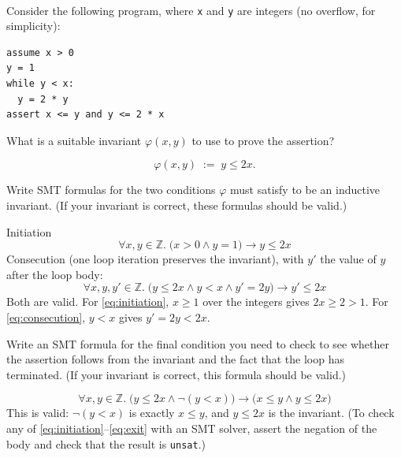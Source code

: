 \documentclass[11pt]{article}
\begin{document}
\begin{qunlist}
\begin{qparts}
\begin{answer}
    \end{answer}
  \end{qparts}

  \\
  Consider the following program, where \texttt{x} and \texttt{y} are integers (no overflow, for simplicity):
\begin{verbatim}
assume x > 0
y = 1
while y < x:
  y = 2 * y
assert x <= y and y <= 2 * x
\end{verbatim}

  \begin{qparts}
  \item
    What is a suitable invariant $\varphi(x,y)$ to use to prove the assertion?

    \begin{answer}
      \[
        \varphi(x,y) \;:=\; y \le 2x .
      \]
    \end{answer}

  \item
    Write SMT formulas for the two conditions $\varphi$ must satisfy to be an inductive invariant.
    (If your invariant is correct, these formulas should be valid.)

    \begin{answer}
      Initiation
      \begin{equation}\label{eq:initiation}
        \forall x, y \in \mathbb{Z}.\; \bigl(x > 0 \wedge y = 1\bigr) \rightarrow y \le 2x
      \end{equation}
      Consecution (one loop iteration preserves the invariant), with $y'$ the value of $y$ after the loop body:
      \begin{equation}\label{eq:consecution}
        \forall x, y, y' \in \mathbb{Z}.\; \bigl(y \le 2x \wedge y < x \wedge y' = 2y\bigr) \rightarrow y' \le 2x
      \end{equation}
      Both are valid. For \eqref{eq:initiation}, $x \ge 1$ over the integers gives $2x \ge 2 > 1$. For \eqref{eq:consecution}, $y < x$ gives $y' = 2y < 2x$.
    \end{answer}

  \item
    Write an SMT formula for the final condition you need to check to see whether the assertion follows from the invariant and the fact that the loop has terminated.
    (If your invariant is correct, this formula should be valid.)

    \begin{answer}
      \begin{equation}\label{eq:exit}
        \forall x, y \in \mathbb{Z}.\; \bigl(y \le 2x \wedge \neg (y < x)\bigr) \rightarrow \bigl(x \le y \wedge y \le 2x\bigr)
      \end{equation}
      This is valid: $\neg(y < x)$ is exactly $x \le y$, and $y \le 2x$ is the invariant.
      (To check any of \eqref{eq:initiation}--\eqref{eq:exit} with an SMT solver, assert the negation of the body and check that the result is \texttt{unsat}.)
    \end{answer}


\end{qparts}
\end{qunlist}
\end{document}
